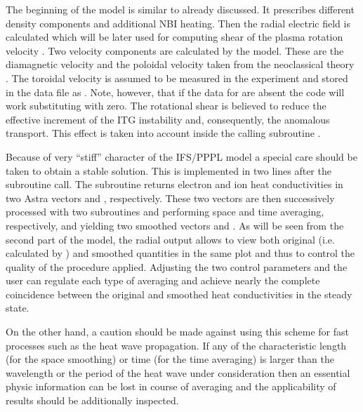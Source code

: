 The beginning of the model is similar to already discussed.
It prescribes different density components and additional NBI heating.
Then the radial electric field is calculated which will be later used 
for computing shear of the plasma rotation velocity .
Two velocity components are calculated by the model. 
These are the diamagnetic velocity  and the poloidal velocity
 taken from the neoclassical theory \cite{SWW}.
The toroidal velocity  is assumed to be measured in the 
experiment and stored in the data file as .
Note, however, that if the data for  are absent the code 
will work substituting  with zero.
The rotational shear  is believed to reduce the effective
increment of the ITG instability and, consequently, the anomalous
transport. 
This effect is taken into account inside the calling subroutine
. 

Because of very ``stiff'' character of the IFS/PPPL model a special
care should be taken to obtain a stable solution.
This is implemented in two lines after the subroutine call.
The subroutine returns electron and ion heat conductivities in two
Astra vectors  and , respectively.
These two vectors are then successively processed with two subroutines 
 and  performing space and time averaging,
respectively, and yielding two smoothed vectors  and 
.
As will be seen from the second part of the model, the radial output 
allows to view both original (i.e. calculated by ) and
smoothed quantities in the same plot and thus to control the quality of 
the procedure applied.
Adjusting the two control parameters  and  the user 
can regulate each type of averaging and achieve nearly the complete 
coincidence between the original and smoothed heat conductivities 
in the steady state.

On the other hand, a caution should be made against using this scheme
for fast processes such as the heat wave propagation.
If any of the characteristic length (for the space smoothing) or time
(for the time averaging) is larger than the wavelength or the period 
of the heat wave under consideration then an essential physic 
information can be lost in course of averaging and the applicability 
of results should be additionally inspected.

